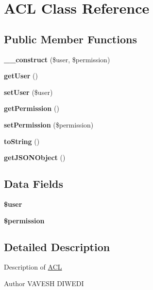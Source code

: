 \hypertarget{class_a_c_l}{\section{A\+C\+L Class Reference}
\label{class_a_c_l}
}
\subsection*{Public Member Functions}
\begin{DoxyCompactItemize}
\item 
\hypertarget{class_a_c_l_ab1660e35552e43ef628457d11d4b99c1}{{\bfseries \+\_\+\+\_\+construct} (\$user, \$permission)}\label{class_a_c_l_ab1660e35552e43ef628457d11d4b99c1}

\item 
\hypertarget{class_a_c_l_ae81b7186fb97a7c6457edcc68c9aa2ef}{{\bfseries get\+User} ()}\label{class_a_c_l_ae81b7186fb97a7c6457edcc68c9aa2ef}

\item 
\hypertarget{class_a_c_l_a45c268861653a20ab9677bbba15ec075}{{\bfseries set\+User} (\$user)}\label{class_a_c_l_a45c268861653a20ab9677bbba15ec075}

\item 
\hypertarget{class_a_c_l_a478067ecf173884c2ee3e5b94e746200}{{\bfseries get\+Permission} ()}\label{class_a_c_l_a478067ecf173884c2ee3e5b94e746200}

\item 
\hypertarget{class_a_c_l_a8210ae206debf14f7d4e61c0b7efbf79}{{\bfseries set\+Permission} (\$permission)}\label{class_a_c_l_a8210ae206debf14f7d4e61c0b7efbf79}

\item 
\hypertarget{class_a_c_l_a5558c5d549f41597377fa1ea8a1cefa3}{{\bfseries to\+String} ()}\label{class_a_c_l_a5558c5d549f41597377fa1ea8a1cefa3}

\item 
\hypertarget{class_a_c_l_a9f94aa39d469f7968687eff905f71fbb}{{\bfseries get\+J\+S\+O\+N\+Object} ()}\label{class_a_c_l_a9f94aa39d469f7968687eff905f71fbb}

\end{DoxyCompactItemize}
\subsection*{Data Fields}
\begin{DoxyCompactItemize}
\item 
\hypertarget{class_a_c_l_a598ca4e71b15a1313ec95f0df1027ca5}{{\bfseries \$user}}\label{class_a_c_l_a598ca4e71b15a1313ec95f0df1027ca5}

\item 
\hypertarget{class_a_c_l_aad04b6f3304fe6a13d5be37f7cd28938}{{\bfseries \$permission}}\label{class_a_c_l_aad04b6f3304fe6a13d5be37f7cd28938}

\end{DoxyCompactItemize}


\subsection{Detailed Description}
Description of \hyperlink{class_a_c_l}{A\+C\+L}

\begin{DoxyAuthor}{Author}
V\+A\+V\+E\+S\+H D\+I\+W\+E\+D\+I 
\end{DoxyAuthor}
